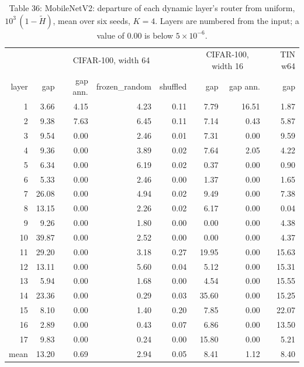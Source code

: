 \documentclass{article}
\begin{document}
\begin{table}
\caption{Table 36: MobileNetV2: departure of each dynamic layer's router from
uniform, $10^3\,(1-\tilde H)$, mean over six seeds, $K=4$. Layers are
numbered from the input; a value of 0.00 is below $5\times10^{-6}$.}

\begin{tabular}{r rrrr rr r}
\toprule
& \multicolumn{4}{c}{CIFAR‑100, width 64} & \multicolumn{2}{c}{CIFAR‑100, width 16} & TIN w64 \\

layer & gap & gap ann. & frozen\_random & shuffled & gap & gap ann. & gap \\
\midrule
1 & 3.66 & 4.15 & 4.23 & 0.11 & 7.79 & 16.51 & 1.87 \\
2 & 9.38 & 7.63 & 6.45 & 0.11 & 7.14 & 0.43 & 5.87 \\
3 & 9.54 & 0.00 & 2.46 & 0.01 & 7.31 & 0.00 & 9.59 \\
4 & 9.36 & 0.00 & 3.89 & 0.02 & 7.64 & 2.05 & 4.22 \\
5 & 6.34 & 0.00 & 6.19 & 0.02 & 0.37 & 0.00 & 0.90 \\
6 & 5.33 & 0.00 & 2.46 & 0.00 & 1.37 & 0.00 & 1.65 \\
7 & 26.08 & 0.00 & 4.94 & 0.02 & 9.49 & 0.00 & 7.38 \\
8 & 13.15 & 0.00 & 2.26 & 0.02 & 6.17 & 0.00 & 0.04 \\
9 & 9.26 & 0.00 & 1.80 & 0.00 & 0.00 & 0.00 & 4.38 \\
10 & 39.87 & 0.00 & 2.52 & 0.00 & 0.00 & 0.00 & 4.37 \\
11 & 29.20 & 0.00 & 3.18 & 0.27 & 19.95 & 0.00 & 15.63 \\
12 & 13.11 & 0.00 & 5.60 & 0.04 & 5.12 & 0.00 & 15.31 \\
13 & 5.94 & 0.00 & 1.68 & 0.00 & 4.54 & 0.00 & 15.55 \\
14 & 23.36 & 0.00 & 0.29 & 0.03 & 35.60 & 0.00 & 15.25 \\
15 & 8.10 & 0.00 & 1.40 & 0.20 & 7.85 & 0.00 & 22.07 \\
16 & 2.89 & 0.00 & 0.43 & 0.07 & 6.86 & 0.00 & 13.50 \\
17 & 9.83 & 0.00 & 0.24 & 0.00 & 15.80 & 0.00 & 5.21 \\
\midrule mean & 13.20 & 0.69 & 2.94 & 0.05 & 8.41 & 1.12 & 8.40 \\
\bottomrule
\end{tabular}
\end{table}
\end{document}
